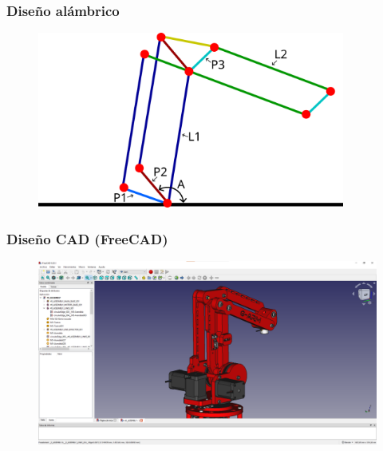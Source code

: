 \documentclass{beamer}
\begin{document}
\begin{frame}
  \frametitle{Diseño alámbrico}
  \begin{figure}[h]
    \centering
    \includegraphics[width=0.9\textwidth]{figs/alambrico_params.png}
  \end{figure}
\end{frame}

\begin{frame}
  \frametitle{Diseño CAD (FreeCAD)}
  \begin{figure}[h]
    \centering
    \includegraphics[width=1\textwidth]{figs/freecadUI.png}
  \end{figure}
\end{frame}
\end{document}
